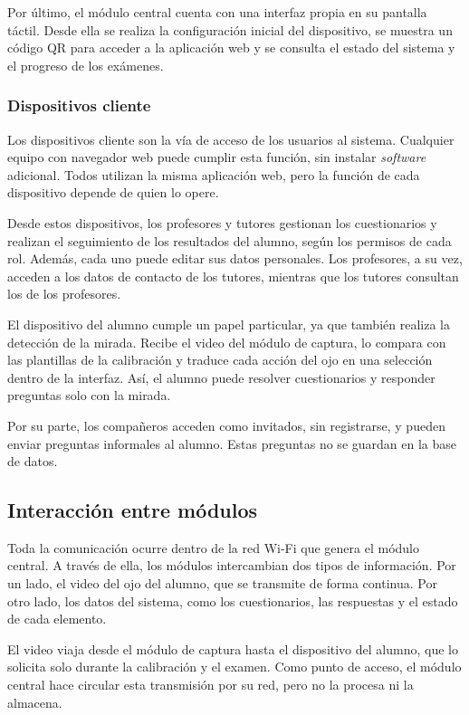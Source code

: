 Por último, el módulo central cuenta con una interfaz propia en su pantalla táctil. Desde ella se realiza la configuración inicial del dispositivo, se muestra un código QR para acceder a la aplicación web y se consulta el estado del sistema y el progreso de los exámenes.

\subsubsection{Dispositivos cliente}

Los dispositivos cliente son la vía de acceso de los usuarios al sistema. Cualquier equipo con navegador web puede cumplir esta función, sin instalar \emph{software} adicional. Todos utilizan la misma aplicación web, pero la función de cada dispositivo depende de quien lo opere.

Desde estos dispositivos, los profesores y tutores gestionan los cuestionarios y realizan el seguimiento de los resultados del alumno, según los permisos de cada rol. Además, cada uno puede editar sus datos personales. Los profesores, a su vez, acceden a los datos de contacto de los tutores, mientras que los tutores consultan los de los profesores.

El dispositivo del alumno cumple un papel particular, ya que también realiza la detección de la mirada. Recibe el video del módulo de captura, lo compara con las plantillas de la calibración y traduce cada acción del ojo en una selección dentro de la interfaz. Así, el alumno puede resolver cuestionarios y responder preguntas solo con la mirada.

Por su parte, los compañeros acceden como invitados, sin registrarse, y pueden enviar preguntas informales al alumno. Estas preguntas no se guardan en la base de datos.

\subsection{Interacción entre módulos}

Toda la comunicación ocurre dentro de la red Wi-Fi que genera el módulo central. A través de ella, los módulos intercambian dos tipos de información. Por un lado, el video del ojo del alumno, que se transmite de forma continua. Por otro lado, los datos del sistema, como los cuestionarios, las respuestas y el estado de cada elemento.

El video viaja desde el módulo de captura hasta el dispositivo del alumno, que lo solicita solo durante la calibración y el examen. Como punto de acceso, el módulo central hace circular esta transmisión por su red, pero no la procesa ni la almacena.

